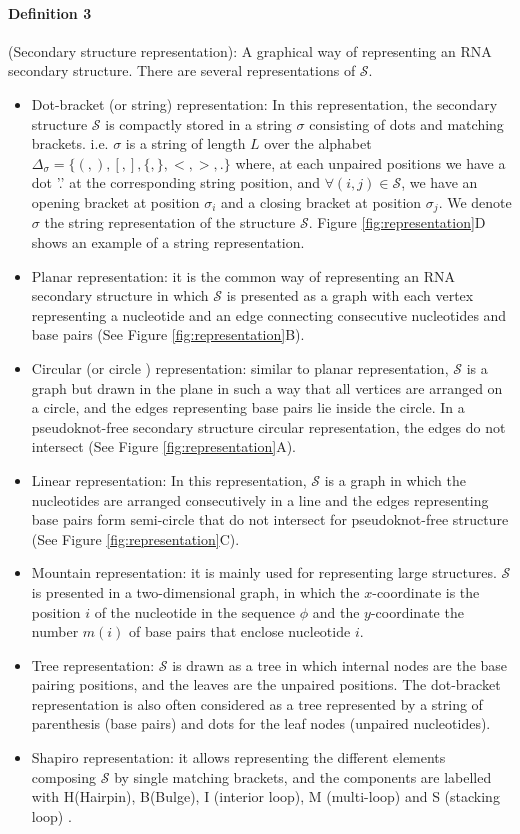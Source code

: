 \paragraph{\textbf{Definition 3} } (Secondary structure representation): A graphical way of representing an RNA secondary structure. There are several representations of $\mathcal{S}$. 
\begin{itemize}
	\item Dot-bracket (or string) representation: In this representation, the secondary structure $\mathcal{S}$  is compactly stored in a string $\sigma$ consisting of dots and matching brackets. i.e.  $\sigma$ is a string of length $L$ over the alphabet $\Delta_{\sigma}= \big\{ (,),[,],\{,\},<,>,.\big\}$ where, at each unpaired positions we have a dot '.' at the corresponding string position, and $\forall (i,j) \in \mathcal{S}$, we have an opening bracket at position $\sigma_i$ and a closing bracket at position $\sigma_j$. We denote $\sigma$ the string representation of the structure $\mathcal{S}$. Figure \ref{fig:representation}D shows an example of a string representation.
	\item Planar representation: it is the common way of representing an RNA secondary structure in which $\mathcal{S}$ is presented as a graph with each vertex representing a nucleotide  and an edge connecting consecutive nucleotides and base pairs (See Figure \ref{fig:representation}B). 
	\item Circular (or circle ) representation: similar to planar representation, $\mathcal{S}$  is a graph but drawn in the plane in such a way that all vertices are arranged on a circle, and the edges representing base pairs lie inside the circle. In a pseudoknot-free secondary structure circular representation, the edges do not intersect (See Figure \ref{fig:representation}A).  
	\item Linear representation: In this representation, $\mathcal{S}$  is a graph in which the nucleotides are arranged consecutively in a line and the edges representing base pairs form semi-circle that do not intersect for pseudoknot-free structure (See Figure \ref{fig:representation}C).
	\item Mountain representation: it is mainly used for representing large structures. $\mathcal{S}$  is presented in a two-dimensional graph, in which the $x$-coordinate is the position $i$ of the nucleotide in the sequence $\phi$ and the $y$-coordinate the number $m(i)$ of base pairs that enclose nucleotide $i$.
	\item Tree representation: $\mathcal{S}$  is drawn as a tree in which internal nodes are the base pairing positions, and the leaves are the unpaired positions. The dot-bracket representation is also often considered as a tree represented by a string of parenthesis (base pairs) and dots for the leaf nodes (unpaired nucleotides). 
	\item Shapiro representation: it allows representing the different elements composing $\mathcal{S}$  by single matching brackets, and the components are labelled with H(Hairpin), B(Bulge), I (interior loop), M (multi-loop) and S (stacking loop) \cite{shapiro1990comparing}.
\end{itemize}
